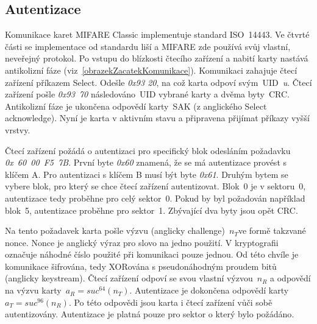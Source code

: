 \subsection{Autentizace}
\label{autentizace}
Komunikace karet MIFARE Classic implementuje standard ISO~14443. Ve čtvrté části se implementace od standardu liší a MIFARE zde používá svůj vlastní, neveřejný protokol. Po vstupu do blízkosti čtecího zařízení a nabití karty nastává antikolizní fáze (viz~\ref{obrazekZacatekKomunikace}). Komunikaci zahajuje čtecí zařízení příkazem Select. Odešle \emph{0x93 20}, na což karta odpoví svým~UID~\emph{u}. Čtecí zařízení pošle \emph{0x93~70} následováno~UID vybrané karty a dvěma byty~CRC. Antikolizní fáze je ukončena odpovědí karty~SAK (z anglického Select acknowledge). Nyní je karta v aktivním stavu a připravena přijímat příkazy vyšší vrstvy\cite{PracticalAttackOnMIFARE}.
\par
Čtecí zařízení požádá o autentizaci pro specifický blok odesláním požadavku \emph{0x~60~00~F5~7B}. První byte \emph{0x60} znamená, že se má autentizace provést s klíčem A. Pro autentizaci s klíčem B musí být byte \emph{0x61}. Druhým bytem se vybere blok, pro který se chce čtecí zařízení autentizovat. Blok~0 je v sektoru~0, autentizace tedy proběhne pro celý sektor~0. Pokud by byl požadován například blok~5, autentizace proběhne pro sektor~1. Zbývající dva byty jsou opět CRC\cite{PracticalAttackOnMIFARE}. 
\par
Na tento požadavek karta pošle výzvu (anglicky challenge)~${n_T}$\footnotemark ve formě takzvané nonce\cite{Wirelessly_Pickpocketing}. Nonce je anglický výraz pro slovo na jedno použití. V kryptografii označuje náhodné číslo použité při komunikaci pouze jednou\cite{Nonce_Based_Encryption}. Od této chvíle je komunikace šifrována, tedy XORována s pseudonáhodným proudem bitů (anglicky keystream). Čtecí zařízení odpoví se svou vlastní výzvou~${n_R}$ a odpovědí na výzvu karty~${a_R = suc^{64}(n_T)}$. Autentizace je dokončena odpovědí karty~${a_T = suc^{96}(n_R)}$. Po této odpovědi jsou karta i čtecí zařízení vůči sobě autentizovány. Autentizace je platná pouze pro sektor o který bylo požádáno\cite{Wirelessly_Pickpocketing}. 


